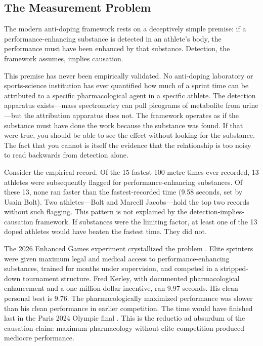 \documentclass[11pt,twocolumn]{article}
\theoremstyle{definition}
\theoremstyle{remark}
\begin{document}
\subsection{The Measurement Problem}

The modern anti-doping framework rests on a deceptively simple premise: if a performance-enhancing substance is detected in an athlete's body, the performance must have been enhanced by that substance. Detection, the framework assumes, implies causation.

This premise has never been empirically validated. No anti-doping laboratory or sports-science institution has ever quantified how much of a sprint time can be attributed to a specific pharmacological agent in a specific athlete. The detection apparatus exists—mass spectrometry can pull picograms of metabolite from urine—but the attribution apparatus does not. The framework operates as if the substance must have done the work because the substance was found. If that were true, you should be able to see the effect without looking for the substance. The fact that you cannot is itself the evidence that the relationship is too noisy to read backwards from detection alone.

Consider the empirical record. Of the 15 fastest 100-metre times ever recorded, 13 athletes were subsequently flagged for performance-enhancing substances. Of these 13, none ran faster than the fastest-recorded time (9.58 seconds, set by Usain Bolt). Two athletes—Bolt and Marcell Jacobs—hold the top two records without such flagging. This pattern is not explained by the detection-implies-causation framework. If substances were the limiting factor, at least one of the 13 doped athletes would have beaten the fastest time. They did not.

The 2026 Enhanced Games experiment crystallized the problem \cite{enhanced2026official}. Elite sprinters were given maximum legal and medical access to performance-enhancing substances, trained for months under supervision, and competed in a stripped-down tournament structure. Fred Kerley, with documented pharmacological enhancement and a one-million-dollar incentive, ran 9.97 seconds. His clean personal best is 9.76. The pharmacologically maximized performance was slower than his clean performance in earlier competition. The time would have finished last in the Paris 2024 Olympic final \cite{paris2024olympics}. This is the reductio ad absurdum of the causation claim: maximum pharmacology without elite competition produced mediocre performance.
\end{document}
